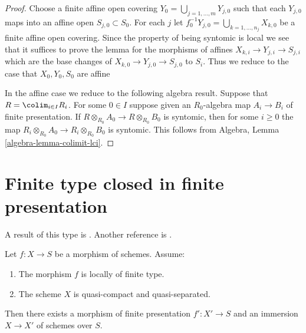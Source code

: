 \begin{proof}
Choose a finite affine open covering
$Y_0 = \bigcup_{j = 1, \ldots, m} Y_{j, 0}$
such that each $Y_{j, 0}$ maps into an affine open
$S_{j, 0} \subset S_0$. For each $j$ let
$f_0^{-1}Y_{j, 0} = \bigcup_{k = 1, \ldots, n_j} X_{k, 0}$ be a
finite affine open covering. Since the property of being syntomic is
local we see that it suffices to prove the lemma for the morphisms
of affines $X_{k, i} \to Y_{j, i} \to S_{j, i}$ which are the base
changes of $X_{k, 0} \to Y_{j, 0} \to S_{j, 0}$ to $S_i$.
Thus we reduce to the case that $X_0, Y_0, S_0$ are affine

\medskip\noindent
In the affine case we reduce to the following algebra result.
Suppose that $R = \colim_{i \in I} R_i$. For some $0 \in I$
suppose given an $R_0$-algebra map $A_i \to B_i$ of finite presentation.
If $R \otimes_{R_0} A_0 \to R \otimes_{R_0} B_0$ is syntomic, then
for some $i \geq 0$ the map
$R_i \otimes_{R_0} A_0 \to R_i \otimes_{R_0} B_0$ is syntomic.
This follows from Algebra,
Lemma \ref{algebra-lemma-colimit-lci}.
\end{proof}





\section{Finite type closed in finite presentation}
\label{section-finite-type-closed-in-finite-presentation}

\noindent
A result of this type is \cite[Satz 2.10]{Kiehl}. Another
reference is \cite{Conrad-Nagata}.

\begin{lemma}
\label{lemma-locally-finite-type-in-finite-presentation}
Let $f : X \to S$ be a morphism of schemes.
Assume:
\begin{enumerate}
\item The morphism $f$ is locally of finite type.
\item The scheme $X$ is quasi-compact and quasi-separated.
\end{enumerate}
Then there exists a morphism of finite presentation
$f' : X' \to S$ and an immersion $X \to X'$ of schemes over $S$.
\end{lemma}

